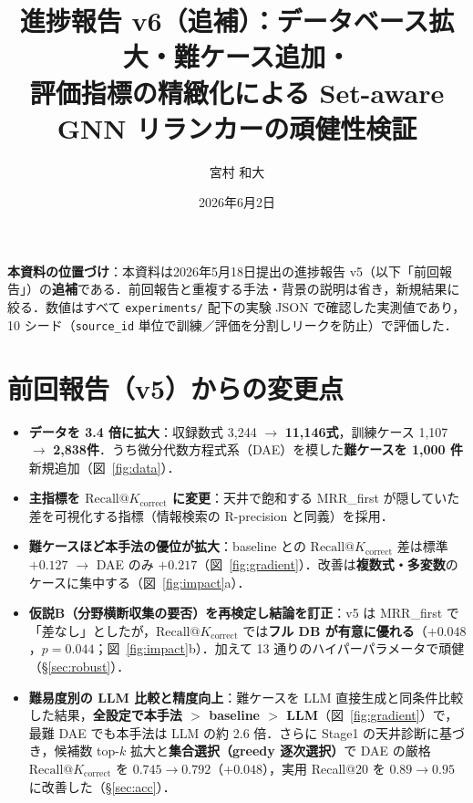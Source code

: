 \documentclass[11pt,a4paper]{ltjsarticle}
\title{{\sffamily 進捗報告 v6（追補）：データベース拡大・難ケース追加・\\評価指標の精緻化による Set-aware GNN リランカーの頑健性検証}}
\author{宮村 和大}
\date{2026年6月2日}
\makeatletter
\newcommand{\rkc}{\textrm{Recall@}K_{\textrm{correct}}}
\makeatother
\begin{document}
\maketitle

\noindent\textbf{本資料の位置づけ}：本資料は2026年5月18日提出の進捗報告 v5（以下「前回報告」）の\textbf{追補}である．前回報告と重複する手法・背景の説明は省き，新規結果に絞る．数値はすべて \texttt{experiments/} 配下の実験 JSON で確認した実測値であり，10 シード（\texttt{source\_id} 単位で訓練／評価を分割しリークを防止）で評価した．

\section{前回報告（v5）からの変更点}
\begin{itemize}[leftmargin=1.4em, nosep]
  \item \textbf{データを 3.4 倍に拡大}：収録数式 3{,}244 $\to$ \textbf{11{,}146式}，訓練ケース 1{,}107 $\to$ \textbf{2{,}838件}．うち微分代数方程式系（DAE）を模した\textbf{難ケースを 1{,}000 件}新規追加（図~\ref{fig:data}）．
  \item \textbf{主指標を $\rkc$ に変更}：天井で飽和する MRR\_first が隠していた差を可視化する指標（情報検索の R-precision と同義）を採用．
  \item \textbf{難ケースほど本手法の優位が拡大}：baseline との $\rkc$ 差は標準 $+0.127$ $\to$ DAE のみ $+0.217$（図~\ref{fig:gradient}）．改善は\textbf{複数式・多変数}のケースに集中する（図~\ref{fig:impact}a）．
  \item \textbf{仮説B（分野横断収集の要否）を再検定し結論を訂正}：v5 は MRR\_first で「差なし」としたが，$\rkc$ では\textbf{フル DB が有意に優れる}（$+0.048$，$p=0.044$；図~\ref{fig:impact}b）．加えて 13 通りのハイパーパラメータで頑健（\S\ref{sec:robust}）．
  \item \textbf{難易度別の LLM 比較と精度向上}：難ケースを LLM 直接生成と同条件比較した結果，\textbf{全設定で本手法 $>$ baseline $>$ LLM}（図~\ref{fig:gradient}）で，最難 DAE でも本手法は LLM の約 2.6 倍．さらに Stage1 の天井診断に基づき，候補数 top-$k$ 拡大と\textbf{集合選択（greedy 逐次選択）}で DAE の厳格 $\rkc$ を $0.745\to0.792$（$+0.048$），実用 Recall@20 を $0.89\to0.95$ に改善した（\S\ref{sec:acc}）．
\end{itemize}

\end{document}
